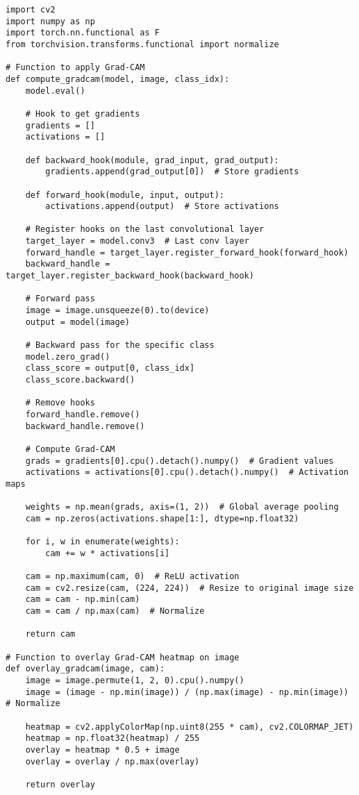 \begin{verbatim}
import cv2
import numpy as np
import torch.nn.functional as F
from torchvision.transforms.functional import normalize

# Function to apply Grad-CAM
def compute_gradcam(model, image, class_idx):
    model.eval()

    # Hook to get gradients
    gradients = []
    activations = []

    def backward_hook(module, grad_input, grad_output):
        gradients.append(grad_output[0])  # Store gradients

    def forward_hook(module, input, output):
        activations.append(output)  # Store activations

    # Register hooks on the last convolutional layer
    target_layer = model.conv3  # Last conv layer
    forward_handle = target_layer.register_forward_hook(forward_hook)
    backward_handle = target_layer.register_backward_hook(backward_hook)

    # Forward pass
    image = image.unsqueeze(0).to(device)
    output = model(image)

    # Backward pass for the specific class
    model.zero_grad()
    class_score = output[0, class_idx]
    class_score.backward()

    # Remove hooks
    forward_handle.remove()
    backward_handle.remove()

    # Compute Grad-CAM
    grads = gradients[0].cpu().detach().numpy()  # Gradient values
    activations = activations[0].cpu().detach().numpy()  # Activation maps

    weights = np.mean(grads, axis=(1, 2))  # Global average pooling
    cam = np.zeros(activations.shape[1:], dtype=np.float32)

    for i, w in enumerate(weights):
        cam += w * activations[i]

    cam = np.maximum(cam, 0)  # ReLU activation
    cam = cv2.resize(cam, (224, 224))  # Resize to original image size
    cam = cam - np.min(cam)
    cam = cam / np.max(cam)  # Normalize

    return cam

# Function to overlay Grad-CAM heatmap on image
def overlay_gradcam(image, cam):
    image = image.permute(1, 2, 0).cpu().numpy()
    image = (image - np.min(image)) / (np.max(image) - np.min(image))  # Normalize

    heatmap = cv2.applyColorMap(np.uint8(255 * cam), cv2.COLORMAP_JET)
    heatmap = np.float32(heatmap) / 255
    overlay = heatmap * 0.5 + image
    overlay = overlay / np.max(overlay)

    return overlay

\end{verbatim}

